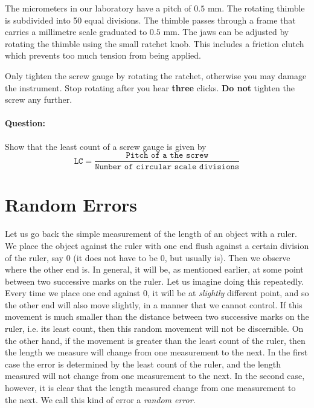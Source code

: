 {\color{red}The micrometers in our laboratory have a pitch of $0.5$ $\mathrm{mm}$.  The rotating thimble is subdivided into 50 equal divisions.  The thimble passes through a frame that carries a millimetre scale graduated to $0.5$ $\mathrm{mm}$.  The jaws can be adjusted by rotating the thimble using the small ratchet knob.  This includes a friction clutch which prevents too much tension from being applied.}

\begin{imp}
Only tighten the screw gauge by rotating the ratchet, otherwise you may damage the instrument. Stop rotating after you hear \textbf{three} clicks. \textbf{Do not} tighten the screw any further.
\end{imp}

\begin{question}
\paragraph{Question:} Show that the least count of a screw gauge is given by
$$\texttt{LC} = \frac{\texttt{Pitch of a the screw}}{\texttt{Number of circular scale divisions}}$$
\end{question}

\section{Random Errors}

Let us go back the simple measurement of the length of an object with a ruler. We place the object against the ruler with one end flush against a certain division of the ruler, say 0 (it does not have to be 0, but usually is). Then we observe where the other end is. In general, it will be, as mentioned earlier, at some point between two successive marks on the ruler. Let us imagine doing this repeatedly. Every time we place one end against 0, it will be at \textit{slightly} different point, and so the other end will also move slightly, in a manner that we cannot control. If this movement is much smaller than the distance between two successive marks on the ruler, i.e. its least count, then this random movement will not be discernible. On the other hand, if the movement is greater than the least count of the ruler, then the length we measure will change from one measurement to the next. In the first case the error is determined by the least count of the ruler, and the length measured will not change from one measurement to the next. In the second case, however, it is clear that the length measured  change from one measurement to the next. We call this kind of error a \textit{random error}.

